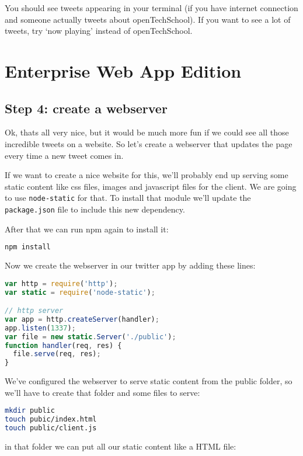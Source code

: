 \documentclass[a4paper]{report}
\begin{document}
\noindent You should see tweets appearing in your terminal (if you have internet connection and someone actually tweets about openTechSchool). If you want to see a lot of tweets, try `now playing' instead of openTechSchool.

\section*{Enterprise Web App Edition}

\subsection*{Step 4: create a webserver}
Ok, thats all very nice, but it would be much more fun if we could see all those incredible tweets on a website. So let's create a webserver that updates the page every time a new tweet comes in.

If we want to create a nice website for this, we'll probably end up serving some static content like css files, images and javascript files for the client. We are going to use \texttt{node-static} for that. To install that module we'll update the \texttt{package.json} file to include this new dependency.



After that we can run npm again to install it:
\begin{lstlisting}[language=bash]
npm install
\end{lstlisting}

\noindent Now we create the webserver in our twitter app by adding these lines:

\begin{lstlisting}[language=JavaScript]
var http = require('http');
var static = require('node-static');

// http server
var app = http.createServer(handler);
app.listen(1337);
var file = new static.Server('./public');
function handler(req, res) {
  file.serve(req, res);
}
\end{lstlisting}

\noindent We've configured the webserver to serve static content from the public folder, so we'll have to create that folder and some files to serve:
\begin{lstlisting}[language=bash]
mkdir public
touch pubic/index.html
touch public/client.js
\end{lstlisting}

\noindent in that folder we can put all our static content like a HTML file:
\end{document}
